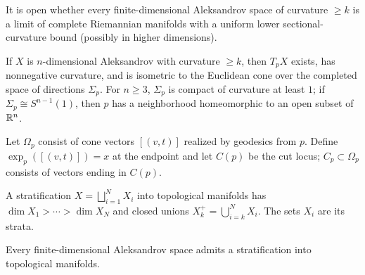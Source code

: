\begin{remark}
\label{rem:chow-iii-g48-riemannian-limits}
It is open whether every finite-dimensional Aleksandrov space of curvature
$\geq k$ is a limit of complete Riemannian manifolds with a uniform lower
sectional-curvature bound (possibly in higher dimensions).
\end{remark}

\begin{theorem}
\label{thm:chow-iii-g49-tangent-cone}
If $X$ is $n$-dimensional Aleksandrov with curvature $\geq k$, then $T_pX$
exists, has nonnegative curvature, and is isometric to the Euclidean cone over
the completed space of directions $\Sigma_p$.  For $n\geq3$, $\Sigma_p$ is
compact of curvature at least $1$; if $\Sigma_p\cong S^{n-1}(1)$, then $p$ has
a neighborhood homeomorphic to an open subset of $\mathbb R^n$.
\end{theorem}

\begin{definition}
\label{def:chow-iii-g50-exponential-cut-locus}
Let $\Omega_p$ consist of cone vectors $[(v,t)]$ realized by geodesics from
$p$.  Define $\exp_p([(v,t)])=x$ at the endpoint and let $C(p)$ be the cut
locus; $C_p\subset\Omega_p$ consists of vectors ending in $C(p)$.
\end{definition}

\begin{definition}[Stratification]
\label{def:chow-iii-g51-stratification}
A stratification $X=\bigsqcup_{i=1}^N X_i$ into topological manifolds has
$\dim X_1>\cdots>\dim X_N$ and closed unions
$X_k^+=\bigcup_{i=k}^N X_i$.  The sets $X_i$ are its strata.
\end{definition}

\begin{theorem}
\label{thm:chow-iii-g52-aleksandrov-stratification}
Every finite-dimensional Aleksandrov space admits a stratification into
topological manifolds.
\end{theorem}

